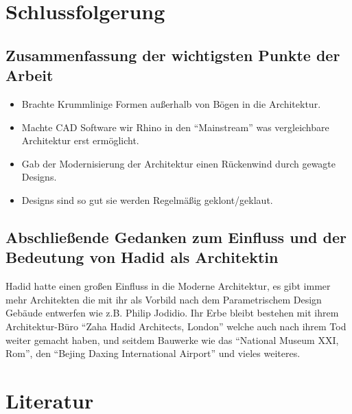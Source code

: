 \documentclass[a4paper, 12p]{article}
\begin{document}


\section{Schlussfolgerung}
\subsection{Zusammenfassung der wichtigsten Punkte der Arbeit}
\begin{itemize}
	\item Brachte Krummlinige Formen außerhalb von Bögen in die Architektur.
	\item Machte CAD Software wir Rhino in den ``Mainstream'' was vergleichbare
		Architektur erst ermöglicht.
	\item Gab der Modernisierung der Architektur einen Rückenwind durch gewagte
		Designs.
	\item Designs sind so gut sie werden Regelmäßig geklont/geklaut.
\end{itemize}

\subsection{Abschließende Gedanken zum Einfluss und der Bedeutung von Hadid als
Architektin}
Hadid hatte einen großen Einfluss in die Moderne Architektur, es gibt immer mehr
Architekten die mit ihr als Vorbild nach dem Parametrischem Design Gebäude
entwerfen wie z.B. Philip Jodidio. Ihr Erbe bleibt bestehen mit ihrem
Architektur-Büro ``Zaha Hadid Architects, London'' welche auch nach ihrem Tod
weiter gemacht haben, und seitdem Bauwerke wie das ``National Museum XXI, Rom'',
den ``Bejing Daxing International Airport'' und vieles weiteres.


\clearpage
\section{Literatur}
\printbibliography
\end{document}
